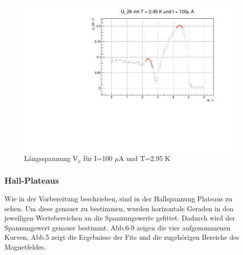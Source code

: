 \begin{figure}
\label{}
\centering
\includegraphics[scale = 0.5]{../plots/U_26_100muA_2950mK.pdf}
\caption{Längsspannung $\text{V}_x$ für I=100 $\mu$A und T=2.95 K}
\end{figure}

\newpage

\subsubsection{Hall-Plateaus}
Wie in der Vorbereitung beschrieben, sind in der Hallspannung Plateaus zu sehen. Um diese genauer zu bestimmen, wurden horizontale Geraden in den jeweiligen Wertebereichen an die Spannungswerte gefittet. Dadurch wird der Spannungswert genauer bestimmt. Abb.6-9 zeigen die vier aufgenommenen Kurven, Abb.5 zeigt die Ergebnisse der Fits und die zugehörigen Bereiche des Magnetfeldes.


